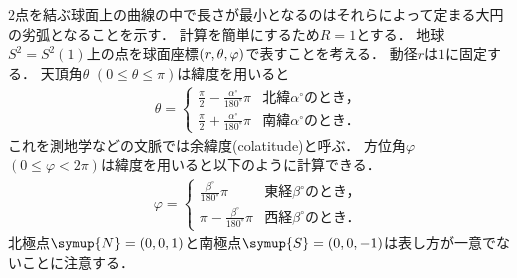 \documentclass{ltjsbook}
\begin{document}

\(2\)点を結ぶ球面上の曲線の中で長さが最小となるのはそれらによって定まる大円の劣弧となることを示す．
計算を簡単にするため\(R = 1\)とする．
地球\(S^2 = S^2(1)\)上の点を球面座標\((r, \theta, \varphi)\)で表すことを考える．
動径\(r\)は\(1\)に固定する．
天頂角\(\theta\) \((0 \leq \theta \leq \pi)\)は緯度を用いると
\begin{align*}
    \theta = \begin{cases}
        \displaystyle
        \frac{\pi}{2} - \frac{\alpha^\circ}{180^\circ} \pi
        & \text{北緯\(\alpha^\circ\)のとき，} \\[10pt]
        \displaystyle
        \frac{\pi}{2} + \frac{\alpha^\circ}{180^\circ} \pi
        & \text{南緯\(\alpha^\circ\)のとき．}
    \end{cases}
\end{align*}
これを測地学などの文脈では余緯度(colatitude)と呼ぶ．
方位角\(\varphi\) \((0 \leq \varphi < 2\pi)\)は緯度を用いると以下のように計算できる．
\begin{align*}
    \varphi = \begin{cases}
        \displaystyle
        \frac{\beta^\circ}{180^\circ} \pi
        & \text{東経\(\beta^\circ\)のとき，} \\[10pt]
        \displaystyle
        \pi - \frac{\beta^\circ}{180^\circ} \pi
        & \text{西経\(\beta^\circ\)のとき．}
    \end{cases}
\end{align*}
北極点\(\symup{N} = (0, 0, 1)\)と南極点\(\symup{S} = (0, 0, -1)\)は表し方が一意でないことに注意する．
\end{document}
